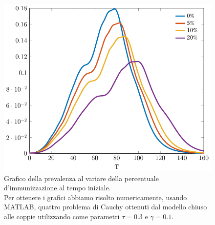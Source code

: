 \begin{figure}[htb]
\centering
\includegraphics{Figure/minnesota_immunizzazione}
%
\caption[Grafico della prevalenza al variare della percentuale d'immunizzazionne.]{Grafico della prevalenza al variare della percentuale d'immunizzazione al tempo iniziale.\\ Per ottenere i grafici abbiamo risolto numericamente, usando MATLAB, quattro problema di Cauchy ottenuti dal modello chiuso alle coppie utilizzando come parametri $\tau=0.3$ e $\gamma=0.1$.}
\label{fig::minnesota_immunizzato}
\end{figure}


